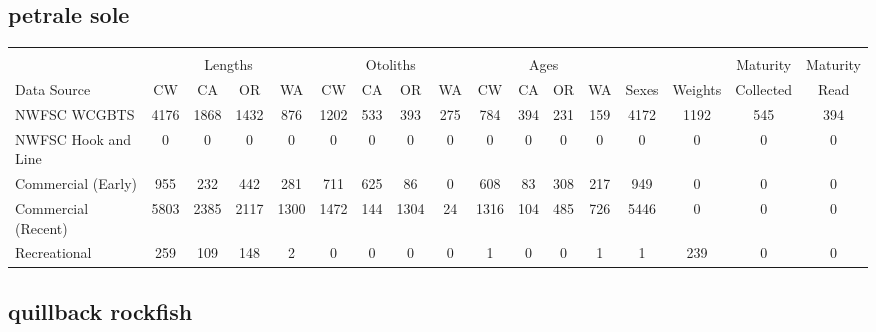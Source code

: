 \documentclass[12pt,]{article}
\begin{document}
\FloatBarrier  

\subsection{petrale sole}\label{petrale-sole}

\begin{table}[ht]
\centering
\begingroup\fontsize{10pt}{10pt}\selectfont
\begin{tabular}{|l|cccc|cccc|cccc|c|c|c|c|}
  \hline
 &  &  &  &  &  &  &  &  &  &  &  &  &  &  &  &  \\ 
   & \multicolumn{4}{c}{Lengths} &  \multicolumn{4}{c}{Otoliths} & \multicolumn{4}{c}{Ages} &  & & Maturity & Maturity\\
 Data Source & CW & CA & OR & WA & CW & CA & OR & WA & CW & CA & OR & WA & Sexes & Weights & Collected & Read\\
 \hline
NWFSC WCGBTS & 4176 & 1868 & 1432 & 876 & 1202 & 533 & 393 & 275 & 784 & 394 & 231 & 159 & 4172 & 1192 & 545 & 394 \\ 
  NWFSC Hook and Line & 0 & 0 & 0 & 0 & 0 & 0 & 0 & 0 & 0 & 0 & 0 & 0 & 0 & 0 & 0 & 0 \\ 
  Commercial (Early) & 955 & 232 & 442 & 281 & 711 & 625 & 86 & 0 & 608 & 83 & 308 & 217 & 949 & 0 & 0 & 0 \\ 
  Commercial (Recent) & 5803 & 2385 & 2117 & 1300 & 1472 & 144 & 1304 & 24 & 1316 & 104 & 485 & 726 & 5446 & 0 & 0 & 0 \\ 
  Recreational & 259 & 109 & 148 & 2 & 0 & 0 & 0 & 0 & 1 & 0 & 0 & 1 & 1 & 239 & 0 & 0 \\ 
   \hline
\end{tabular}
\endgroup
\end{table}

\FloatBarrier  

\subsection{quillback rockfish}\label{quillback-rockfish}
\end{document}
